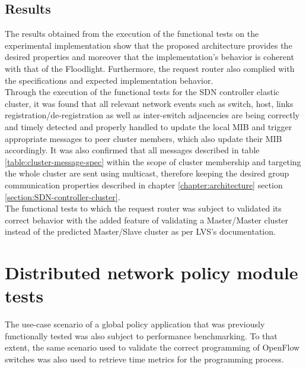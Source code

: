 \subsection{Results}
\label{section:functional-tests-results}
%
The results obtained from the execution of the functional tests on the experimental implementation show that the proposed architecture provides the desired properties and moreover that the implementation's behavior is coherent with that of the Floodlight.
Furthermore, the request router also complied with the specifications and expected implementation behavior.\\
%
Through the execution of the functional tests for the \gls{SDN} controller elastic cluster, it was found that all relevant network events such as switch, host, links registration/de-registration as well as inter-switch adjacencies are being correctly and timely detected and properly handled to update the local \gls{MIB} and trigger appropriate messages to peer cluster members, which also update their \gls{MIB} accordingly.
It was also confirmed that all messages described in table \ref{table:cluster-message-spec} within the scope of cluster membership and targeting the whole cluster are sent using multicast, therefore keeping the desired group communication properties described in chapter \ref*{chapter:architecture} section \ref{section:SDN-controller-cluster}.\\
%
The functional tests to which the request router was subject to validated its correct behavior with the added feature of validating a Master/Master cluster instead of the predicted Master/Slave cluster as per \gls{LVS}'s documentation.
%
\section{Distributed network policy module tests}
\label{section:performance-tests}
The use-case scenario of a global policy application that was previously functionally tested was also subject to performance benchmarking.
To that extent, the same scenario used to validate the correct programming of OpenFlow switches was also used to retrieve time metrics for the programming process.
%
